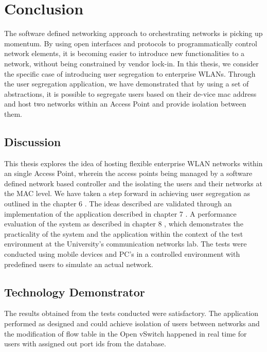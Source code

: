 \chapter{Conclusion}
The software defined networking approach to orchestrating networks is picking up momentum. By using open interfaces and protocols to programmatically control network elements, it is becoming easier to introduce new functionalities to a network, without being constrained by vendor lock-in. In this thesis, we consider the specific case of introducing user segregation to enterprise WLANs. Through the user segregation application, we have demonstrated that by using a set of abstractions, it is possible to segregate users based on their de-vice mac address and host two networks within an Access Point and provide isolation between them.

\section{Discussion}
This thesis explores the idea of hosting flexible enterprise WLAN networks within an single Access Point, wherein the access points being managed by a software defined network based controller and the isolating the users and their networks at the MAC level. We have taken a step forward in achieving user segregation as outlined in the chapter 6 . The ideas described are validated through an implementation of the application described in chapter 7 . A performance evaluation of the system as described in chapter 8 , which demonstrates the practicality of the system and the application within the context of the test environment at the University’s communication networks lab. The tests were conducted using mobile devices and PC’s in a controlled environment with predefined users to simulate an actual network.

\section{Technology Demonstrator}
The results obtained from the tests conducted were satisfactory. The application performed as designed and could achieve isolation of users between networks and the modification of flow table in the Open vSwitch happened in real time for users with assigned out port ids from the database. 

